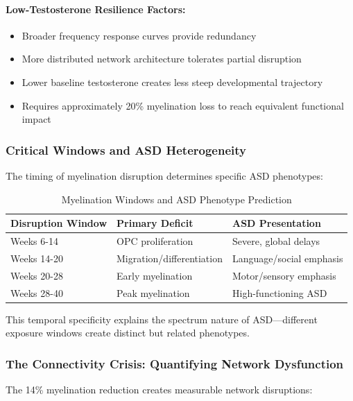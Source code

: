 \documentclass[11pt]{article}
\let\oldsubsubsection\subsubsection
\renewcommand{\subsubsection}[1]{\oldsubsubsection{#1}\setlength{\leftskip}{1.5em}}
\begin{document}
\paragraph{Low-Testosterone Resilience Factors:}
\begin{itemize}
\item Broader frequency response curves provide redundancy
\item More distributed network architecture tolerates partial disruption
\item Lower baseline testosterone creates less steep developmental trajectory
\item Requires approximately 20\% myelination loss to reach equivalent functional impact
\end{itemize}

\subsubsection{Critical Windows and ASD Heterogeneity}

The timing of myelination disruption determines specific ASD phenotypes:

\begin{table}[h]
\centering
\caption{Myelination Windows and ASD Phenotype Prediction}
\begin{tabular}{|l|l|l|}
\hline
\textbf{Disruption Window} & \textbf{Primary Deficit} & \textbf{ASD Presentation} \\
\hline
Weeks 6-14 & OPC proliferation & Severe, global delays \\
Weeks 14-20 & Migration/differentiation & Language/social emphasis \\
Weeks 20-28 & Early myelination & Motor/sensory emphasis \\
Weeks 28-40 & Peak myelination & High-functioning ASD \\
\hline
\end{tabular}
\end{table}

This temporal specificity explains the spectrum nature of ASD—different exposure windows create distinct but related phenotypes.

\subsubsection{The Connectivity Crisis: Quantifying Network Dysfunction}

The 14\% myelination reduction creates measurable network disruptions:
\end{document}
